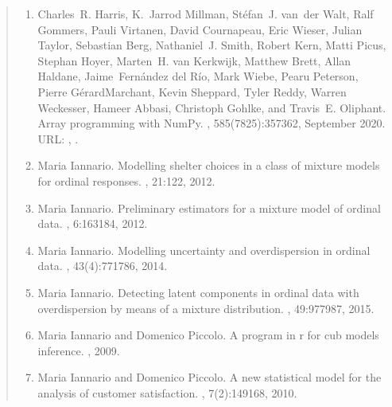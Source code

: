 \documentclass[letterpaper,10pt,english]{sphinxmanual}
\begin{document}
\begin{quote}
\begin{enumerate}
\item {} 
\sphinxAtStartPar
Charles R. Harris, K. Jarrod Millman, Stéfan J. van der Walt, Ralf Gommers, Pauli Virtanen, David Cournapeau, Eric Wieser, Julian Taylor, Sebastian Berg, Nathaniel J. Smith, Robert Kern, Matti Picus, Stephan Hoyer, Marten H. van Kerkwijk, Matthew Brett, Allan Haldane, Jaime Fernández del Río, Mark Wiebe, Pearu Peterson, Pierre Gérard\sphinxhyphen{}Marchant, Kevin Sheppard, Tyler Reddy, Warren Weckesser, Hameer Abbasi, Christoph Gohlke, and Travis E. Oliphant. Array programming with NumPy. , 585(7825):357\textendash{}362, September 2020. URL: , .

\item {} 
\sphinxAtStartPar
Maria Iannario. Modelling shelter choices in a class of mixture models for ordinal responses. , 21:1\textendash{}22, 2012.

\item {} 
\sphinxAtStartPar
Maria Iannario. Preliminary estimators for a mixture model of ordinal data. , 6:163\textendash{}184, 2012.

\item {} 
\sphinxAtStartPar
Maria Iannario. Modelling uncertainty and overdispersion in ordinal data. , 43(4):771\textendash{}786, 2014.

\item {} 
\sphinxAtStartPar
Maria Iannario. Detecting latent components in ordinal data with overdispersion by means of a mixture distribution. , 49:977\textendash{}987, 2015.

\item {} 
\sphinxAtStartPar
Maria Iannario and Domenico Piccolo. A program in r for cub models inference. , 2009.

\item {} 
\sphinxAtStartPar
Maria Iannario and Domenico Piccolo. A new statistical model for the analysis of customer satisfaction. , 7(2):149\textendash{}168, 2010.


\end{enumerate}
\end{quote}
\end{document}
